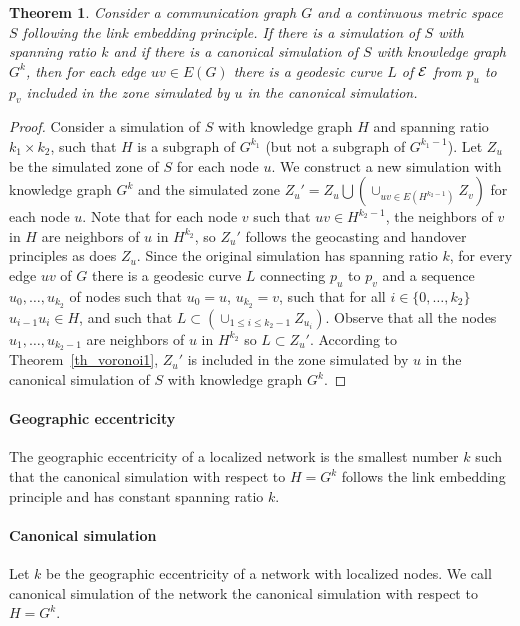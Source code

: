 \documentclass{article}
\newcommand{\englobing}{{\cal E}}
\newtheorem{theorem}{Theorem}
\begin{document}
\newpage
\begin{theorem}
Consider a communication graph $G$ and a continuous metric space $S$ following the link embedding principle. If there is a simulation of $S$ with spanning ratio $k$ and if there is a canonical simulation of $S$ with knowledge graph $G^k$, then for each edge $uv\in E(G)$ there is a geodesic curve $L$ of $\englobing$ from $p_u$ to $p_v$ included in the zone simulated by $u$ in the canonical simulation.
\label{th_constant}
\end{theorem}
\begin{proof}
Consider a simulation of $S$ with knowledge graph $H$ and spanning ratio $k_1\times k_2$, such that $H$ is a subgraph of $G^{k_1}$ (but not a subgraph of $G^{k_1-1}$).
Let $Z_u$ be the simulated zone of $S$ for each node $u$. We construct a new simulation with knowledge graph $G^k$ and the simulated zone $Z_u' = Z_u\bigcup(\cup_{uv\in E(H^{k_2-1})} Z_v)$ for each node $u$. Note that for each node $v$ such that $uv\in H^{k_2-1}$, the neighbors of $v$ in $H$ are neighbors of $u$ in $H^{k_2}$, so $Z_u'$ follows the geocasting and handover principles as does $Z_u$. Since the original simulation has spanning ratio $k$, for every edge $uv$ of $G$ there is a geodesic curve $L$ connecting $p_u$ to $p_v$ and a sequence $u_0,\dots,u_{k_2}$ of nodes such that $u_0=u$, $u_{k_2}=v$, such that for all $i\in\{0,\dots,k_2\}$ $u_{i-1}u_i\in H$, and such that $L\subset(\cup_{1\leq i\leq k_2-1} Z_{u_i})$. Observe that all the nodes $u_1,\dots,u_{k_2-1}$ are neighbors of $u$ in $H^{k_2}$ so $L\subset Z_u'$. According to Theorem~\ref{th_voronoi1}, $Z_u'$ is included in the zone simulated by $u$ in the canonical simulation of $S$ with knowledge graph $G^k$.
\end{proof}

\paragraph{Geographic eccentricity} The geographic eccentricity of a localized network is the smallest number $k$ such that the canonical simulation with respect to $H=G^k$ follows the link embedding principle and has constant spanning ratio $k$.

\paragraph{Canonical simulation}
Let $k$ be the geographic eccentricity of a network with localized nodes. We call canonical simulation of the network the canonical simulation with respect to $H=G^k$.
\end{document}
